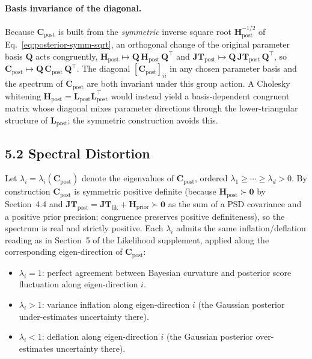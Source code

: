 \documentclass[11pt]{article}
\begin{document}
\paragraph{Basis invariance of the diagonal.}
Because $\mathbf C_{\mathrm{post}}$ is built from the \emph{symmetric} inverse square root $\mathbf H_{\mathrm{post}}^{-1/2}$ of Eq.~\eqref{eq:posterior-symm-sqrt}, an orthogonal change of the original parameter basis $\mathbf Q$ acts congruently, $\mathbf H_{\mathrm{post}} \mapsto \mathbf Q\, \mathbf H_{\mathrm{post}}\, \mathbf Q^\top$ and $\mathbf{JT}_{\mathrm{post}} \mapsto \mathbf Q\, \mathbf{JT}_{\mathrm{post}}\, \mathbf Q^\top$, so $\mathbf C_{\mathrm{post}} \mapsto \mathbf Q\, \mathbf C_{\mathrm{post}}\, \mathbf Q^\top$. The diagonal $[\mathbf C_{\mathrm{post}}]_{ii}$ in any chosen parameter basis and the spectrum of $\mathbf C_{\mathrm{post}}$ are both invariant under this group action. A Cholesky whitening $\mathbf H_{\mathrm{post}} = \mathbf L_{\mathrm{post}}\mathbf L_{\mathrm{post}}^\top$ would instead yield a basis-dependent congruent matrix whose diagonal mixes parameter directions through the lower-triangular structure of $\mathbf L_{\mathrm{post}}$; the symmetric construction avoids this.

\subsection*{5.2 Spectral Distortion}

Let $\lambda_i = \lambda_i(\mathbf C_{\mathrm{post}})$ denote the eigenvalues of $\mathbf C_{\mathrm{post}}$, ordered $\lambda_1 \geq \cdots \geq \lambda_d > 0$. By construction $\mathbf C_{\mathrm{post}}$ is symmetric positive definite (because $\mathbf H_{\mathrm{post}} \succ \mathbf 0$ by Section~4.4 and $\mathbf{JT}_{\mathrm{post}} = \mathbf{JT}_{\mathrm{lik}} + \mathbf H_{\mathrm{prior}} \succ \mathbf 0$ as the sum of a PSD covariance and a positive prior precision; congruence preserves positive definiteness), so the spectrum is real and strictly positive. Each $\lambda_i$ admits the same inflation/deflation reading as in Section~5 of the Likelihood supplement, applied along the corresponding eigen-direction of $\mathbf C_{\mathrm{post}}$:
\begin{itemize}
\item $\lambda_i = 1$: perfect agreement between Bayesian curvature and posterior score fluctuation along eigen-direction $i$.
\item $\lambda_i > 1$: variance inflation along eigen-direction $i$ (the Gaussian posterior under-estimates uncertainty there).
\item $\lambda_i < 1$: deflation along eigen-direction $i$ (the Gaussian posterior over-estimates uncertainty there).
\end{itemize}
\end{document}
